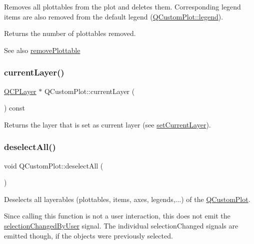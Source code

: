 Removes all plottables from the plot and deletes them. Corresponding legend items are also removed from the default legend (\mbox{\hyperlink{class_q_custom_plot_a4eadcd237dc6a09938b68b16877fa6af}{Q\+Custom\+Plot\+::legend}}).

Returns the number of plottables removed.

\begin{DoxySeeAlso}{See also}
\mbox{\hyperlink{class_q_custom_plot_af3dafd56884208474f311d6226513ab2}{remove\+Plottable}} 
\end{DoxySeeAlso}
\mbox{\label{class_q_custom_plot_a0421d647f420b0b4c57aec1708857af5}} 
\subsubsection{\texorpdfstring{current\+Layer()}{currentLayer()}}
{\footnotesize\ttfamily \mbox{\hyperlink{class_q_c_p_layer}{Q\+C\+P\+Layer}} $\ast$ Q\+Custom\+Plot\+::current\+Layer (\begin{DoxyParamCaption}{ }\end{DoxyParamCaption}) const}

Returns the layer that is set as current layer (see \mbox{\hyperlink{class_q_custom_plot_a73a6dc47c653bb6f8f030abca5a11852}{set\+Current\+Layer}}). \mbox{\label{class_q_custom_plot_a9d4808ab925b003054085246c92a257c}} 
\subsubsection{\texorpdfstring{deselect\+All()}{deselectAll()}}
{\footnotesize\ttfamily void Q\+Custom\+Plot\+::deselect\+All (\begin{DoxyParamCaption}{ }\end{DoxyParamCaption})}

Deselects all layerables (plottables, items, axes, legends,...) of the \mbox{\hyperlink{class_q_custom_plot}{Q\+Custom\+Plot}}.

Since calling this function is not a user interaction, this does not emit the \mbox{\hyperlink{class_q_custom_plot_a500c64a109bc773c973ad274f2fa4190}{selection\+Changed\+By\+User}} signal. The individual selection\+Changed signals are emitted though, if the objects were previously selected.

